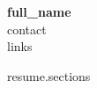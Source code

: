 \documentclass[10pt,letterpaper]{article}
\begin{document}
{\LARGE\textbf{ {{full_name}} }}\\
{{contact}}\\
{{links}}

{{resume.sections}}
\end{document}
